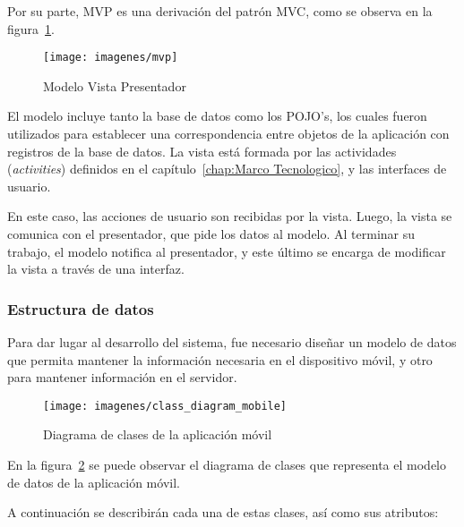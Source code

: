 Por su parte, MVP es una derivación del patrón MVC, como se observa en la figura~\ref{fig:mvp}.

\begin{figure}[ht]
  \centering
  \texttt{[image: imagenes/mvp]}
  \caption{Modelo Vista Presentador}
  \label{fig:mvp}
\end{figure}

El modelo incluye tanto la base de datos como los POJO's, los cuales fueron utilizados para establecer una correspondencia entre objetos de la aplicación con registros de la base de datos. La vista está formada por las actividades (\textit{activities}) definidos en el capítulo~\ref{chap:Marco Tecnologico}, y las interfaces de usuario.
 
En este caso, las acciones de usuario son recibidas por la vista. Luego, la vista se comunica con el presentador, que pide los datos al modelo. Al terminar su trabajo, el modelo notifica al presentador, y este último se encarga de modificar la vista a través de una interfaz.



\subsubsection{Estructura de datos}

Para dar lugar al desarrollo del sistema, fue necesario diseñar un modelo de datos que permita mantener la información necesaria en el dispositivo móvil, y otro para mantener información en el servidor.


\begin{figure}[ht]
  \centering
  \texttt{[image: imagenes/class\_diagram\_mobile]}
  \caption{Diagrama de clases de la aplicación móvil}
  \label{fig:diagramaClasesMovil}
\end{figure}

En la figura~\ref{fig:diagramaClasesMovil} se puede observar el diagrama de clases que representa el modelo de datos de la aplicación móvil. 


A continuación se describirán cada una de estas clases, así como sus atributos:

